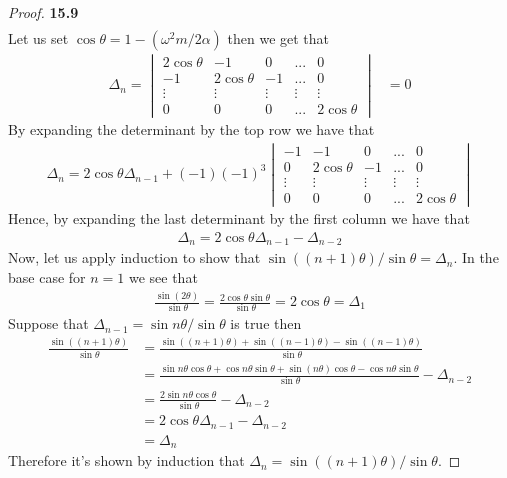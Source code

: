 \documentclass[11pt]{article}
\theoremstyle{definition}
\begin{document}
\begin{proof}{\textbf{15.9}}
\begin{align*}
    \end{align*}
    Let us set $\cos\theta = 1 - (\omega^2m/2\alpha)$ then we get that
    \begin{align*}
        \Delta_n = \begin{vmatrix}
            2\cos\theta  & -1 & 0 & ... & 0\\
            -1 & 2\cos\theta & -1 & ... & 0\\
            \vdots & \vdots & \vdots & \vdots & \vdots\\
            0 & 0 & 0 &... & 2\cos\theta
    \end{vmatrix} &= 0
    \end{align*}
    By expanding the determinant by the top row we have that
    \begin{align*}
        \Delta_{n} = 2\cos\theta\Delta_{n-1} + (-1)(-1)^3\begin{vmatrix}
        -1 & -1 & 0 &... & 0\\
        0 & 2\cos\theta& -1 & ... & 0\\
        \vdots & \vdots & \vdots & \vdots & \vdots\\
        0 & 0 & 0 &... & 2\cos\theta
    \end{vmatrix}
    \end{align*}
    Hence, by expanding the last determinant by the first column we have that
    \begin{align*}
        \Delta_{n} = 2\cos\theta\Delta_{n-1} -\Delta_{n-2}
    \end{align*}
    Now, let us apply induction to show that
    $\sin((n+1)\theta)/\sin\theta = \Delta_n$.
    In the base case for $n = 1$ we see that
    \begin{align*}
        \frac{\sin(2\theta)}{\sin\theta}
        = \frac{2\cos\theta\sin\theta}{\sin\theta}
        = 2\cos\theta = \Delta_1
    \end{align*}
    Suppose that $\Delta_{n-1} = \sin n\theta/\sin\theta$ is true then
    \begin{align*}
        \frac{\sin((n +1)\theta)}{\sin\theta}
        &= \frac{\sin((n + 1)\theta) + \sin((n - 1)\theta)
        - \sin((n - 1)\theta)}{\sin\theta}\\
        &= \frac{\sin n\theta\cos\theta + \cos n\theta\sin\theta
        + \sin(n\theta)\cos\theta - \cos n\theta\sin\theta}
        {\sin\theta} - \Delta_{n-2}\\
        &= \frac{2\sin n\theta\cos\theta}{\sin\theta} - \Delta_{n-2}\\
        &= 2\cos\theta\Delta_{n-1} - \Delta_{n-2}\\
        &= \Delta_n
    \end{align*}
    Therefore it's shown by induction that
    $\Delta_n = \sin((n+1)\theta)/\sin\theta$.


\end{proof}
\end{document}
